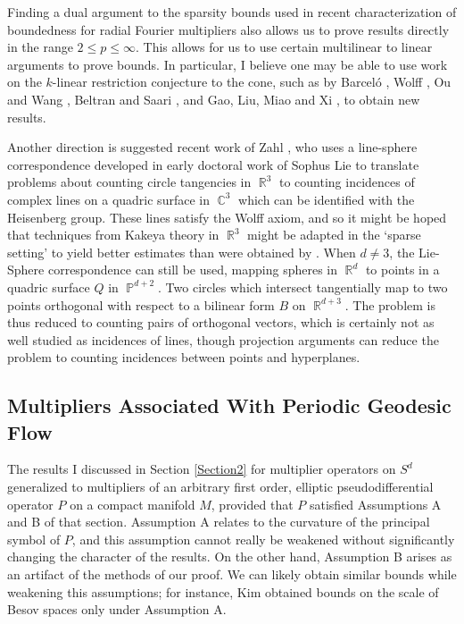 \documentclass[11pt]{article}
\DeclareMathOperator{\RR}{\mathbb{R}}
\DeclareMathOperator{\CC}{\mathbb{C}}
\DeclareMathOperator{\PP}{\mathbb{P}}
\begin{document}
Finding a dual argument to the sparsity bounds used in recent characterization of boundedness for radial Fourier multipliers also allows us to prove results directly in the range $2 \leq p \leq \infty$. This allows for us to use certain multilinear to linear arguments to prove bounds. In particular, I believe one may be able to use work on the $k$-linear restriction conjecture to the cone, such as by Barcel\'{o} \cite{Barcelo}, Wolff \cite{Wolff}, Ou and Wang \cite{OuWang}, Beltran and Saari \cite{BeltranSaari}, and Gao, Liu, Miao and Xi \cite{GaoLiuMiaoXi}, to obtain new results.

Another direction is suggested recent work of Zahl \cite{ZahlLieSphere}, who uses a line-sphere correspondence developed in early doctoral work of Sophus Lie to translate problems about counting circle tangencies in $\RR^3$ to counting incidences of complex lines on a quadric surface in $\CC^3$ which can be identified with the Heisenberg group. These lines satisfy the Wolff axiom, and so it might be hoped that techniques from Kakeya theory in $\RR^3$ might be adapted in the `sparse setting' to yield better estimates than were obtained by \cite{Cladek}. When $d \neq 3$, the Lie-Sphere correspondence can still be used, mapping spheres in $\RR^d$ to points in a quadric surface $Q$ in $\PP^{d+2}$. Two circles which intersect tangentially map to two points orthogonal with respect to a bilinear form $B$ on $\RR^{d+3}$. The problem is thus reduced to counting pairs of orthogonal vectors, which is certainly not as well studied as incidences of lines, though projection arguments can reduce the problem to counting incidences between points and hyperplanes.

\subsection{Multipliers Associated With Periodic Geodesic Flow}

The results I discussed in Section \ref{Section2} for multiplier operators on $S^d$ generalized to multipliers of an arbitrary first order, elliptic pseudodifferential operator $P$ on a compact manifold $M$, provided that $P$ satisfied Assumptions A and B of that section. Assumption A relates to the curvature of the principal symbol of $P$, and this assumption cannot really be weakened without significantly changing the character of the results. On the other hand, Assumption B arises as an artifact of the methods of our proof. We can likely obtain similar bounds while weakening this assumptions; for instance, Kim \cite{KimManifold} obtained bounds on the scale of Besov spaces only under Assumption A.
\end{document}
